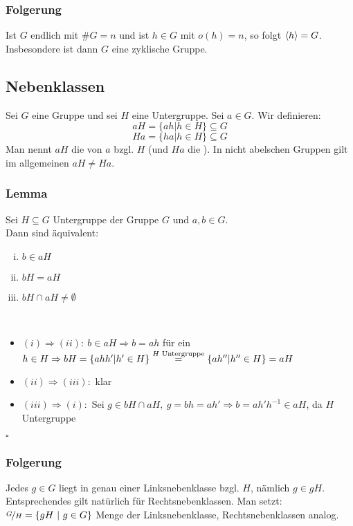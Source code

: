 \subsubsection*{Folgerung}
Ist $G$ endlich mit $\#G=n$ und ist $h\in G$ mit $o(h)=n$, so folgt $\langle h \rangle=G$. 
Insbesondere ist dann $G$ eine zyklische Gruppe.

\subsection{Nebenklassen}
\label{sub:nebenklassen}
 

Sei $G$ eine Gruppe und sei $H$ eine Untergruppe. 
Sei $a\in G$. Wir definieren:
\[
aH=\{ah | h\in H\}\subseteq G
\]
\[
Ha=\{ha | h\in H\}\subseteq G
\]
Man nennt $aH$ die  von $a$ bzgl. $H$ (und $Ha$ die ). 
In nicht abelschen Gruppen gilt im allgemeinen $aH\not=Ha$.

\subsubsection*{Lemma}
Sei $H\subseteq G$ Untergruppe der Gruppe $G$ und $a,b\in G$.\\
Dann sind äquivalent:
\begin{enumerate}[(i)]
	\item $b\in aH$
	\item $bH=aH$
	\item $bH \cap aH \not= \emptyset$
\end{enumerate}
\\
\begin{itemize}
	\item$(i)\Rightarrow (ii):~b\in aH \Rightarrow b=ah$ für ein $h\in H \Rightarrow bH=\{ahh' | h' \in H\}\\
	\stackrel{H\text{ Untergruppe}}{=}\{ah'' | h''\in H\}=aH$
	\item$(ii) \Rightarrow (iii):$ klar
	\item$(iii) \Rightarrow (i):$ Sei $g \in bH \cap aH,~g=bh=ah' \Rightarrow b=ah'h^{-1} \in aH$, da $H$ Untergruppe
\end{itemize}
\hfill $\square$

\subsubsection*{Folgerung}
Jedes $g\in G$ liegt in genau einer Linksnebenklasse bzgl. $H$, nämlich $g \in gH$.
Entsprechendes gilt natürlich für Rechtsnebenklassen. Man setzt:\\
$\nicefrac{G}{H}=\{gH~|~g \in G \}$ Menge der Linksnebenklasse, Rechtsnebenklassen analog.

